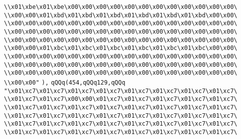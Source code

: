\verb|\\x01\xbe\x01\xbe\x00\x00\x00\x00\x00\x00\x00\x00\x00\x00\x00\x00\|\newline
\verb|\\x00\x00\x01\xbd\x01\xbd\x01\xbd\x01\xbd\x01\xbd\x01\xbd\x00\x00\|\newline
\verb|\\x00\x00\x00\x00\x00\x00\x00\x00\x00\x00\x00\x00\x00\x00\x00\x00\|\newline
\verb|\\x00\x00\x00\x00\x00\x00\x00\x00\x00\x00\x00\x00\x00\x00\x00\x00\|\newline
\verb|\\x00\x00\x00\x00\x00\x00\x00\x00\x00\x00\x00\x00\x00\x00\x00\x00\|\newline
\verb|\\x00\x00\x01\xbc\x01\xbc\x01\xbc\x01\xbc\x01\xbc\x01\xbc\x00\x00\|\newline
\verb|\\x00\x00\x00\x00\x00\x00\x00\x00\x00\x00\x00\x00\x00\x00\x00\x00\|\newline
\verb|\\x00\x00\x00\x00\x00\x00\x00\x00\x00\x00\x00\x00\x00\x00\x00\x00\|\newline
\verb|\\x00\x00\x00\x00\x00\x00\x00\x00\x00\x00\x00\x00\x00\x00\x00\x00\|\newline
\verb|\\x00\x00"|\newline
\verb|),|\newline
\verb|qQQq(454,qQQq129,qQQq|\newline
\verb|"\x01\xc7\x01\xc7\x01\xc7\x01\xc7\x01\xc7\x01\xc7\x01\xc7\x01\xc7\|\newline
\verb|\\x01\xc7\x01\xc7\x00\x00\x01\xc7\x01\xc7\x01\xc7\x01\xc7\x01\xc7\|\newline
\verb|\\x01\xc7\x01\xc7\x01\xc7\x01\xc7\x01\xc7\x01\xc7\x01\xc7\x01\xc7\|\newline
\verb|\\x01\xc7\x01\xc7\x01\xc7\x01\xc7\x01\xc7\x01\xc7\x01\xc7\x01\xc7\|\newline
\verb|\\x01\xc7\x01\xc7\x01\xc7\x01\xc7\x01\xc7\x01\xc7\x01\xc7\x01\xc7\|\newline
\verb|\\x01\xc7\x01\xc7\x01\xc7\x01\xc7\x01\xc7\x01\xc7\x01\xc7\x01\xc7\|\newline

